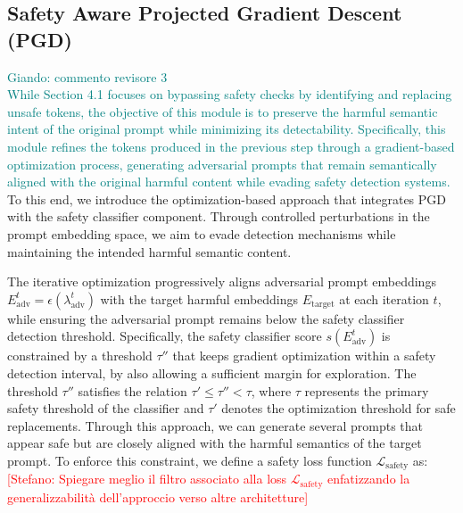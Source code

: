 \documentclass[acmsmall]{acmart}
\newcommand{\ste}[1]{\textcolor{red}{[Stefano: #1]}}
\newcommand{\giando}[1]{\textcolor{teal}{Giando: #1}}
\newcommand{\revthree}[1]{\textcolor{olive}{Revisore3: #1}}
\begin{document}
{\subsection{Safety Aware Projected Gradient Descent (PGD)}\label{subsec:safety_pgd}
\giando{ commento revisore 3\\
While Section 4.1 focuses on bypassing safety checks by identifying and replacing unsafe tokens, the objective of this module is to preserve the harmful semantic intent of the original prompt while minimizing its detectability. Specifically, this module refines the tokens produced in the previous step through a gradient-based optimization process, generating adversarial prompts that remain semantically aligned with the original harmful content while evading safety detection systems.}
To this end, we introduce the optimization-based approach that integrates PGD with the safety classifier component. Through controlled perturbations in the prompt embedding space, we aim to evade detection mechanisms while maintaining the intended harmful semantic content.

The iterative optimization progressively aligns adversarial prompt embeddings \( E^t_{\text{adv}}=\epsilon(\lambda_{\text{adv}}^{t}) \) with the target harmful embeddings \( E_{\text{target}} \) at each iteration \( t \), while ensuring the adversarial prompt remains below the safety classifier detection threshold. Specifically, the safety classifier score \( s(E^t_{\text{adv}}) \) is constrained by a threshold \( \tau'' \) that keeps gradient optimization within a safety detection interval, by also allowing a sufficient margin for exploration. The threshold \( \tau'' \) satisfies the relation \( \tau' \leq \tau'' < \tau \), where \( \tau \) represents the primary safety threshold of the classifier and \( \tau' \) denotes the optimization threshold for safe replacements. 
Through this approach, we can generate several prompts that appear safe but are closely aligned with the harmful semantics of the target prompt. To enforce this constraint, we define a safety loss function $\mathcal{L}_{\text{safety}}$ as:
\ste{Spiegare meglio il filtro associato alla loss $\mathcal{L}_{\text{safety}}$ enfatizzando la generalizzabilità dell'approccio verso altre architetture}

}
\end{document}
